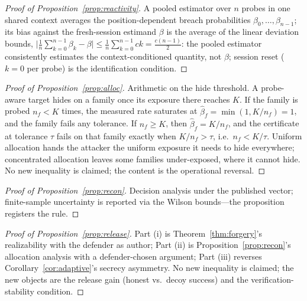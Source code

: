 \begin{proof}[Proof of Proposition~\ref{prop:reactivity}]
A pooled estimator over $n$ probes in one shared context averages the
position-dependent breach probabilities $\beta_0,\dots,\beta_{n-1}$; its bias
against the fresh-session estimand $\beta$ is the average of the linear
deviation bounds,
$\bigl|\frac{1}{n}\sum_{k=0}^{n-1}\beta_k-\beta\bigr|\le\frac{1}{n}\sum_{k=0}^{n-1}ck
=\frac{c(n-1)}{2}$:
the pooled estimator consistently estimates the context-conditioned
quantity, not $\beta$; session reset ($k=0$ per probe) is the identification
condition.
\end{proof}

\begin{proof}[Proof of Proposition~\ref{prop:alloc}]
Arithmetic on the hide threshold. A probe-aware target hides on a family once
its exposure there reaches $K$. If the family is probed $n_f<K$ times, the
measured rate saturates at $\hat\beta_f=\min(1,K/n_f)=1$, and the family fails
any tolerance. If $n_f\ge K$, then $\hat\beta_f=K/n_f$, and the certificate at
tolerance $\tau$ fails on that family exactly when $K/n_f>\tau$, i.e.\
$n_f<K/\tau$. Uniform allocation hands the attacker the uniform
exposure it needs to hide everywhere; concentrated allocation leaves some
families under-exposed, where it cannot hide. No new inequality is claimed;
the content is the operational reversal.
\end{proof}

\begin{proof}[Proof of Proposition~\ref{prop:recon}]
Decision analysis under the published vector; finite-sample uncertainty is
reported via the Wilson bounds---the proposition registers the rule.
\end{proof}

\begin{proof}[Proof of Proposition~\ref{prop:release}]
Part (i) is Theorem~\ref{thm:forgery}'s realizability with the defender as
author; Part (ii) is Proposition~\ref{prop:recon}'s allocation analysis
with a defender-chosen argument; Part (iii) reverses
Corollary~\ref{cor:adaptive}'s secrecy asymmetry. No new inequality is
claimed; the new objects are the release gain (honest vs.\ decoy success)
and the verification-stability condition.
\end{proof}

